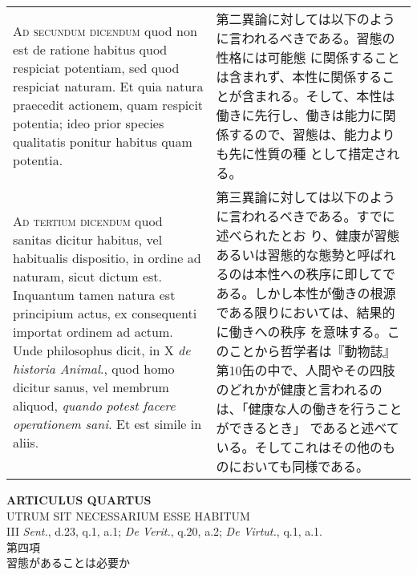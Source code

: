 \documentclass[10pt]{jsarticle} %
\begin{document}
\begin{longtable}{p{21em}p{21em}}
\\



{\scshape Ad secundum dicendum} quod non est de ratione habitus quod respiciat
potentiam, sed quod respiciat naturam. Et quia natura praecedit
actionem, quam respicit potentia; ideo prior species qualitatis
ponitur habitus quam potentia.

&

第二異論に対しては以下のように言われるべきである。習態の性格には可能態
に関係することは含まれず、本性に関係することが含まれる。そして、本性は
働きに先行し、働きは能力に関係するので、習態は、能力よりも先に性質の種
として措定される。

\\



{\scshape Ad tertium dicendum} quod sanitas dicitur habitus, vel habitualis
dispositio, in ordine ad naturam, sicut dictum est. Inquantum tamen
natura est principium actus, ex consequenti importat ordinem ad
actum. Unde philosophus dicit, in X {\itshape de historia Animal}., quod homo
dicitur sanus, vel membrum aliquod, {\itshape quando potest facere operationem
sani}. Et est simile in aliis.

&

第三異論に対しては以下のように言われるべきである。すでに述べられたとお
り、健康が習態あるいは習態的な態勢と呼ばれるのは本性への秩序に即してで
ある。しかし本性が働きの根源である限りにおいては、結果的に働きへの秩序
を意味する。このことから哲学者は『動物誌』第10缶の中で、人間やその四肢
のどれかが健康と言われるのは、「健康な人の働きを行うことができるとき」
であると述べている。そしてこれはその他のものにおいても同様である。

\\

\end{longtable}
\newpage


\begin{center}
{\Large {\bf ARTICULUS QUARTUS}}\\
{\large UTRUM SIT NECESSARIUM ESSE HABITUM}\\
{\footnotesize III {\itshape Sent.}, d.23, q.1, a.1; {\itshape De
 Verit.}, q.20, a.2; {\itshape De Virtut.}, q.1, a.1.}\\
{\Large 第四項\\習態があることは必要か}
\end{center}
\end{document}
